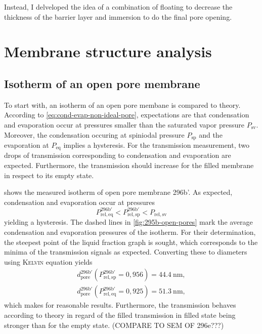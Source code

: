 \documentclass[../thesis.tex]{subfiles}
\begin{document}
        Instead, I delveloped the idea of a combination of floating to decrease the thickness of the barrier layer and immersion to do the final pore opening.



    \section{Membrane structure analysis}

      \subsection{Isotherm of an open pore membrane}
      \label{subsec:open-pore-isotherm}

        To start with, an isotherm of an open pore membane is compared to theory. According to \cref{eq:cond-evap-non-ideal-pore}, expectations are that condensation and evaporation occur at pressures smaller than the saturated vapor pressure $P_\mathrm{sv}$. Moreover, the condensation occuring at spiniodal pressure $P_\mathrm{sp}$ and the evaporation at $P_\mathrm{eq}$ implies a hysteresis. For the transmission measurement, two drops of transmission corresponding to condensation and evaporation are expected. Furthermore, the transmission should increase for the filled membrane in respect to its empty state.

         shows the measured isotherm of open pore membrane 296b'. As expected, condensation and evaporation occur at pressures
        \begin{equation*}
          P_\mathrm{rel,eq}^\mathrm{296b'} < P_\mathrm{rel,sp}^\mathrm{296b'} < P_\mathrm{rel,sv}
        \end{equation*}
        yielding a hysteresis. The dashed lines in \cref{fig:295b-open-pores} mark the average condensation and evaporation pressures of the isotherm. For their determination, the steepest point of the liquid fraction graph is sought, which corresponds to the minima of the transmission signals as expected. Converting these to diameters using \textsc{Kelvin} equation yields
        \begin{align*}
          d_\mathrm{pore}^\mathrm{296b'}(P_\mathrm{rel,sp}^\mathrm{296b'}=0,956)=\SI{44,4}{\nano\meter}, \\
          d_\mathrm{pore}^\mathrm{296b'}(P_\mathrm{rel,eq}^\mathrm{296b'}=0,925)=\SI{51,3}{\nano\meter},
        \end{align*}
        which makes for reasonable results. Furthermore, the transmission behaves according to theory in regard of the filled transmission in filled state being stronger than for the empty state.  (COMPARE TO SEM OF 296e???)
        \medskip
\end{document}
